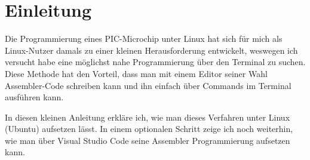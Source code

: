 \section{Einleitung}
\label{sec:einleitung}
Die Programmierung eines PIC-Microchip unter Linux hat sich für mich als Linux-Nutzer damals zu einer kleinen Herausforderung entwickelt, weswegen ich versucht habe eine möglichst nahe Programmierung über den Terminal zu suchen. Diese Methode hat den Vorteil, dass man mit einem Editor seiner Wahl Assembler-Code schreiben kann und ihn einfach über Commands im Terminal ausführen kann.

In diesen kleinen Anleitung erkläre ich, wie man dieses Verfahren unter Linux (Ubuntu) aufsetzen lässt. In einem optionalen Schritt zeige ich noch weiterhin, wie man über Visual Studio Code seine Assembler Programmierung aufsetzen kann.